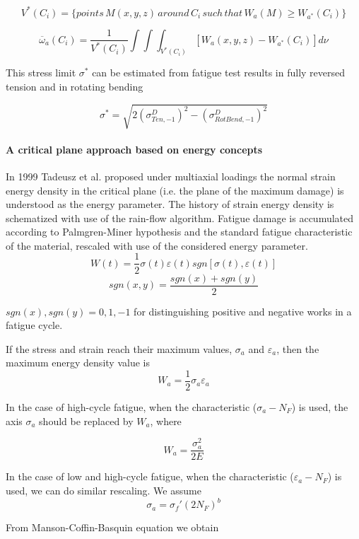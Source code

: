 \documentclass[3p,times,procedia,number]{elsarticle}
\begin{document}
         $$V^*(C_i)=\lbrace points\, M(x,y,z) \,around\, C_i \,such\, that \,W_a(M)\geqslant W_{a^*}(C_i) \rbrace$$
         
         $$\overline{\omega}_a(C_i)=\frac{1}{V^*(C_i)}\int\int\int_{V^*(C_i)}^{}[W_a(x,y,z)-W_{a^*}(C_i)]d\nu$$
         
         This stress limit $\sigma^*$ can be estimated from
         fatigue test results in fully reversed tension and in rotating
         bending
         
         $$\sigma^*=\sqrt{2(\sigma_{Ten,-1}^D)^2-(\sigma_{RotBend,-1}^D)^2}$$
         
         
\paragraph{A critical plane approach based on energy concepts}
In 1999 Tadeusz et al.\cite{lagoda1999critical} proposed under multiaxial loadings the normal strain energy density in the critical plane (i.e. the plane of the maximum damage) is understood as the energy parameter. The history of strain energy density is schematized with use of the rain-flow algorithm. Fatigue damage is accumulated according to Palmgren-Miner hypothesis and the standard fatigue characteristic of the material, rescaled with use of the considered energy parameter. 
         $$W(t)=\frac{1}{2}\sigma(t)\varepsilon(t)sgn[\sigma(t),\varepsilon(t)]$$
         $$sgn(x,y)=\frac{sgn(x)+sgn(y)}{2}$$
         
         $sgn(x),sgn(y)=0,1,-1$ for distinguishing positive and negative works in a
         fatigue cycle.
         
         If the stress and strain reach their maximum values,
         $\sigma_a$ and $\varepsilon_a$, then the maximum energy density value is
         $$W_a=\frac{1}{2}\sigma_a\varepsilon_a$$
         
         In the case of high-cycle fatigue,
         when the characteristic ($\sigma_a-N_F$) is used, the axis $\sigma_a$
         should be replaced by $W_a$, where
         
         $$W_a=\frac{\sigma_a^2}{2E}$$
         
         In the case of low and high-cycle fatigue, when the
         characteristic ($\varepsilon_a-N_F$) is used, we can do similar rescaling. We assume $$\sigma_a=\sigma_f'(2N_F)^b$$
         
         From Manson-Coffin-Basquin equation we obtain
         
\end{document}
